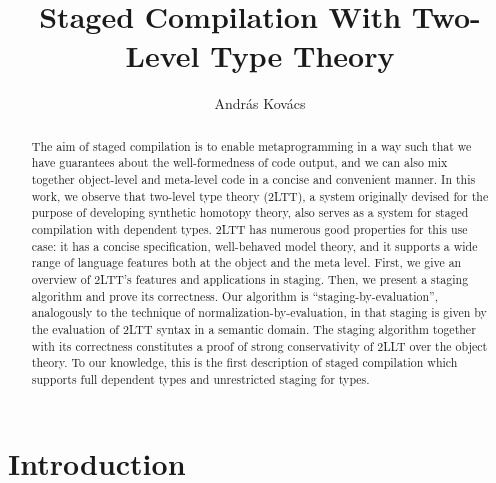 \documentclass[acmsmall,review]{acmart}
\theoremstyle{remark}
\begin{document}
\title{Staged Compilation With Two-Level Type Theory}

\author{András Kovács}

\begin{abstract}
The aim of staged compilation is to enable metaprogramming in a way such that we
have guarantees about the well-formedness of code output, and we can also mix
together object-level and meta-level code in a concise and convenient manner. In
this work, we observe that two-level type theory (2LTT), a system originally
devised for the purpose of developing synthetic homotopy theory, also serves as
a system for staged compilation with dependent types. 2LTT has numerous good
properties for this use case: it has a concise specification, well-behaved model
theory, and it supports a wide range of language features both at the object and
the meta level. First, we give an overview of 2LTT's features and applications
in staging. Then, we present a staging algorithm and prove its correctness. Our
algorithm is ``staging-by-evaluation'', analogously to the technique of
normalization-by-evaluation, in that staging is given by the evaluation of 2LTT
syntax in a semantic domain. The staging algorithm together with its correctness
constitutes a proof of strong conservativity of 2LLT over the object theory. To our
knowledge, this is the first description of staged compilation which supports
full dependent types and unrestricted staging for types.
\end{abstract}

\begin{CCSXML}
\end{CCSXML}

\maketitle

\section{Introduction}\label{sec:introduction}
\end{document}
